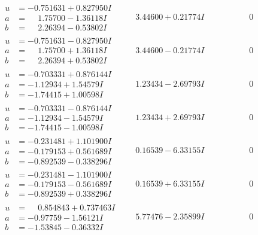 \documentclass[1p]{elsarticle_modified}
\theoremstyle{definition}
\begin{document}
$$\begin{array}{c|c|c}
\begin{aligned}
u &= -0.751631 + 0.827950 I \\
a &= \phantom{-}1.75700 - 1.36118 I \\
b &= \phantom{-}2.26394 - 0.53802 I\end{aligned}
 & \phantom{-}3.44600 + 0.21774 I & \phantom{-0.000000 } 0 \\ \hline\begin{aligned}
u &= -0.751631 - 0.827950 I \\
a &= \phantom{-}1.75700 + 1.36118 I \\
b &= \phantom{-}2.26394 + 0.53802 I\end{aligned}
 & \phantom{-}3.44600 - 0.21774 I & \phantom{-0.000000 } 0 \\ \hline\begin{aligned}
u &= -0.703331 + 0.876144 I \\
a &= -1.12934 + 1.54579 I \\
b &= -1.74415 + 1.00598 I\end{aligned}
 & \phantom{-}1.23434 - 2.69793 I & \phantom{-0.000000 } 0 \\ \hline\begin{aligned}
u &= -0.703331 - 0.876144 I \\
a &= -1.12934 - 1.54579 I \\
b &= -1.74415 - 1.00598 I\end{aligned}
 & \phantom{-}1.23434 + 2.69793 I & \phantom{-0.000000 } 0 \\ \hline\begin{aligned}
u &= -0.231481 + 1.101900 I \\
a &= -0.179153 + 0.561689 I \\
b &= -0.892539 - 0.338296 I\end{aligned}
 & \phantom{-}0.16539 - 6.33155 I & \phantom{-0.000000 } 0 \\ \hline\begin{aligned}
u &= -0.231481 - 1.101900 I \\
a &= -0.179153 - 0.561689 I \\
b &= -0.892539 + 0.338296 I\end{aligned}
 & \phantom{-}0.16539 + 6.33155 I & \phantom{-0.000000 } 0 \\ \hline\begin{aligned}
u &= \phantom{-}0.854843 + 0.737463 I \\
a &= -0.97759 - 1.56121 I \\
b &= -1.53845 - 0.36332 I\end{aligned}
 & \phantom{-}5.77476 - 2.35899 I & \phantom{-0.000000 } 0 \\ \hline\begin{aligned}

\end{aligned}
\end{array}$$
\end{document}
